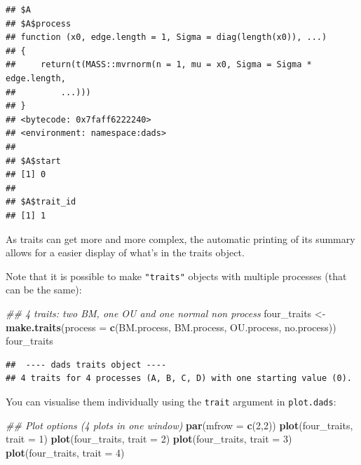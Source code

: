 \documentclass[]{book}
\newenvironment{Shaded}{\begin{snugshade}}{\end{snugshade}}
\newcommand{\CommentTok}[1]{\textcolor[rgb]{0.56,0.35,0.01}{\textit{#1}}}
\newcommand{\DataTypeTok}[1]{\textcolor[rgb]{0.13,0.29,0.53}{#1}}
\newcommand{\DecValTok}[1]{\textcolor[rgb]{0.00,0.00,0.81}{#1}}
\newcommand{\KeywordTok}[1]{\textcolor[rgb]{0.13,0.29,0.53}{\textbf{#1}}}
\newcommand{\NormalTok}[1]{#1}
\newcommand{\StringTok}[1]{\textcolor[rgb]{0.31,0.60,0.02}{#1}}
\begin{document}
\begin{verbatim}
## $A
## $A$process
## function (x0, edge.length = 1, Sigma = diag(length(x0)), ...) 
## {
##     return(t(MASS::mvrnorm(n = 1, mu = x0, Sigma = Sigma * edge.length, 
##         ...)))
## }
## <bytecode: 0x7faff6222240>
## <environment: namespace:dads>
## 
## $A$start
## [1] 0
## 
## $A$trait_id
## [1] 1
\end{verbatim}

As traits can get more and more complex, the automatic printing of its summary allows for a easier display of what's in the traits object.

Note that it is possible to make \texttt{"traits"} objects with multiple processes (that can be the same):

\begin{Shaded}
\begin{Highlighting}[]
\CommentTok{## 4 traits: two BM, one OU and one normal non process}
\NormalTok{four_traits <-}\StringTok{ }\KeywordTok{make.traits}\NormalTok{(}\DataTypeTok{process =} \KeywordTok{c}\NormalTok{(BM.process,}
\NormalTok{                                       BM.process,}
\NormalTok{                                       OU.process,}
\NormalTok{                                       no.process))}
\NormalTok{four_traits}
\end{Highlighting}
\end{Shaded}

\begin{verbatim}
##  ---- dads traits object ---- 
## 4 traits for 4 processes (A, B, C, D) with one starting value (0).
\end{verbatim}

You can visualise them individually using the \texttt{trait} argument in \texttt{plot.dads}:

\begin{Shaded}
\begin{Highlighting}[]
\CommentTok{## Plot options (4 plots in one window)}
\KeywordTok{par}\NormalTok{(}\DataTypeTok{mfrow =} \KeywordTok{c}\NormalTok{(}\DecValTok{2}\NormalTok{,}\DecValTok{2}\NormalTok{))}
\KeywordTok{plot}\NormalTok{(four_traits, }\DataTypeTok{trait =} \DecValTok{1}\NormalTok{)}
\KeywordTok{plot}\NormalTok{(four_traits, }\DataTypeTok{trait =} \DecValTok{2}\NormalTok{)}
\KeywordTok{plot}\NormalTok{(four_traits, }\DataTypeTok{trait =} \DecValTok{3}\NormalTok{)}
\KeywordTok{plot}\NormalTok{(four_traits, }\DataTypeTok{trait =} \DecValTok{4}\NormalTok{)}
\end{Highlighting}
\end{Shaded}
\end{document}
